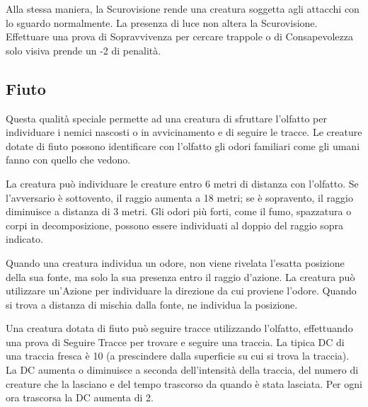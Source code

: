 \begin{multicols}{2}
Alla stessa maniera, la Scurovisione rende una creatura soggetta agli attacchi con lo sguardo normalmente. La presenza di luce non altera la Scurovisione.
Effettuare una prova di Sopravvivenza per cercare trappole o di Consapevolezza solo visiva prende un -2 di penalità.

\subsection{Fiuto}\label{fiuto}

Questa qualità speciale permette ad una creatura di sfruttare l'olfatto per individuare i nemici nascosti o in avvicinamento e di seguire le tracce. Le creature dotate di fiuto possono identificare con l'olfatto gli odori familiari come gli umani fanno con quello che vedono.

La creatura può individuare le creature entro 6 metri di distanza con l'olfatto. Se l'avversario è sottovento, il raggio aumenta a 18 metri; se è sopravento, il raggio diminuisce a distanza di 3 metri.
Gli odori più forti, come il fumo, spazzatura o corpi in decomposizione, possono essere individuati al doppio del raggio sopra indicato.

Quando una creatura individua un odore, non viene rivelata l'esatta posizione della sua fonte, ma solo la sua presenza entro il raggio d'azione. La creatura può utilizzare un'Azione per individuare la direzione da cui proviene l'odore. Quando si trova a distanza di mischia dalla fonte, ne individua la posizione.

Una creatura dotata di fiuto può seguire tracce utilizzando l'olfatto, effettuando una prova di Seguire Tracce per trovare e seguire una traccia. La tipica DC di una traccia fresca è 10 (a prescindere dalla superficie su cui si trova la traccia). La DC aumenta o diminuisce a seconda dell'intensità della traccia, del numero di creature che la lasciano e del tempo trascorso da quando è stata lasciata. Per ogni ora trascorsa la DC aumenta di 2.


\end{multicols}
